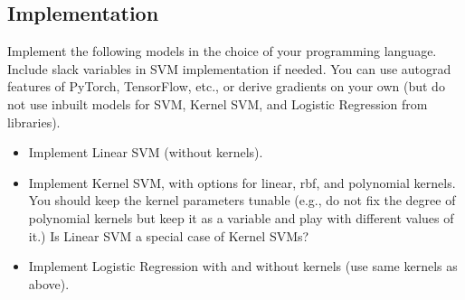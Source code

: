 \documentclass[a4paper]{article}
\theoremstyle{definition}
\begin{document}
\subsection{Implementation}
Implement the following models in the choice of your programming language. Include slack variables in SVM implementation if needed. You can use autograd features of PyTorch, TensorFlow, etc., or derive gradients on your own (but do not use inbuilt models for SVM, Kernel SVM, and Logistic Regression from libraries).
\begin{itemize}
    \item Implement Linear SVM (without kernels).
    \item Implement Kernel SVM, with options for linear, rbf, and polynomial kernels. You should keep the kernel parameters tunable (e.g., do not fix the degree of polynomial kernels but keep it as a variable and play with different values of it.) Is Linear SVM a special case of Kernel SVMs?
\item Implement Logistic Regression with and without kernels (use same kernels as above).
\end{itemize}
\end{document}
